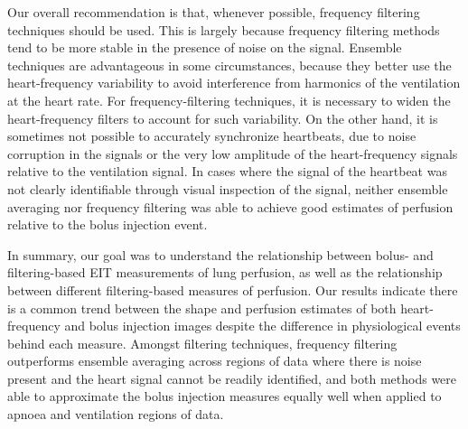 Our overall recommendation is that, whenever possible, 
frequency filtering techniques should be used. This is largely
because frequency filtering methods tend to be more stable in the 
presence of noise on the signal. 
Ensemble techniques are advantageous
in some circumstances, because they better use the heart-frequency
variability to avoid interference from harmonics of the
ventilation at the heart rate. For frequency-filtering
techniques, it is necessary to widen the heart-frequency
filters to account for such variability.
On the other hand, it is sometimes not possible to accurately
synchronize heartbeats, due to noise corruption in the
signals or the very low amplitude of the heart-frequency signals
relative to the ventilation signal.
In cases where the signal of the heartbeat 
was not clearly identifiable through visual inspection of the signal, neither 
ensemble averaging nor frequency filtering was able to achieve good 
estimates of perfusion relative to the bolus injection event. 

In summary, 
our goal was to understand the relationship between bolus- and filtering-based
EIT measurements of lung perfusion, as well as the relationship between different
filtering-based measures of perfusion.
Our results indicate there is a common trend between the shape and perfusion  
estimates of both heart-frequency and bolus injection images 
despite the difference in physiological events behind each measure.
Amongst filtering techniques, frequency
filtering outperforms ensemble averaging across regions of data where there is noise present and the 
heart signal cannot be readily identified, and both methods were able to approximate the bolus injection 
measures equally well when applied to apnoea and ventilation regions of data.


